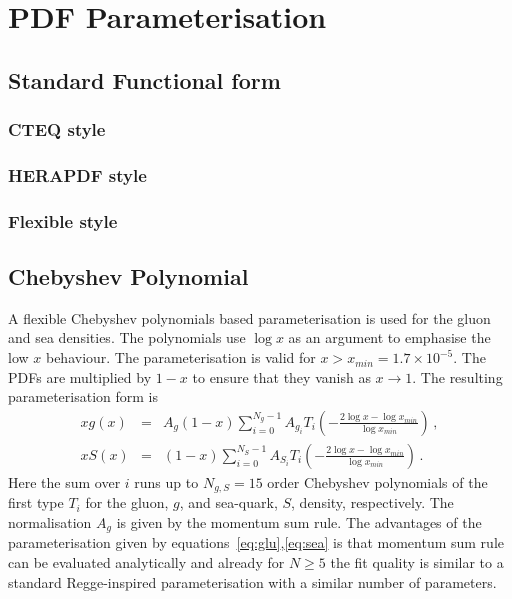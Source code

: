 \documentclass[11pt,a4paper]{article}
\begin{document}
\section{PDF Parameterisation}
\label{sec:pdfparam}
\subsection{Standard Functional form}
\subsubsection{CTEQ style}
\subsubsection{HERAPDF style}
\subsubsection{Flexible style}
\subsection{Chebyshev Polynomial}

A flexible Chebyshev polynomials based parameterisation is used for the gluon and sea densities. The polynomials
use $\log x$ as an argument to emphasise the low $x$ behaviour. 
The parameterisation is valid for $x>x_{min} = 1.7\times 10^{-5}$. The PDFs are multiplied
by $1-x$ to ensure that they vanish as $x\to 1$. The resulting parameterisation form is 
\begin{eqnarray}
x g(x) &=& A_g \left(1-x\right) \sum_{i=0}^{N_g-1} A_{g_i} T_i \left(-\frac{\textstyle 2\log x - \log x_{min} } {\textstyle \log x_{min} } \right)\,, \label{eq:glu} \\
x S(x) &=& \left(1-x\right) \sum_{i=0}^{N_S-1} A_{S_i} T_i \left(-\frac{\textstyle 2\log x - \log x_{min} } {\textstyle \log x_{min} } \right)\,. \label{eq:sea} 
\end{eqnarray}
Here the sum over $i$ runs up to $N_{g,S}=15$ order Chebyshev polynomials of the first type $T_i$ for
the gluon, $g$, and sea-quark, $S$, density, respectively. 
The normalisation $A_g$ is given by the momentum sum rule.
The advantages of the parameterisation given by equations~\ref{eq:glu},\ref{eq:sea} is that momentum
sum rule can be evaluated analytically and  already for $N \ge 5$ the fit quality
is similar to a standard Regge-inspired parameterisation with a similar number of parameters.
\end{document}
